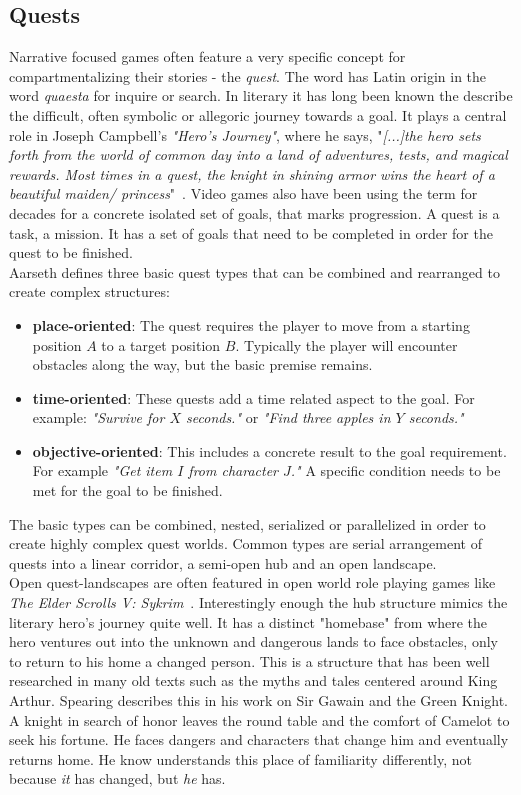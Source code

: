 \subsection{Quests}
Narrative focused games often feature a very specific concept for compartmentalizing their stories - the \textit{quest}. The word has Latin origin in the word \textit{quaesta} for inquire or search. In literary it has long been known the describe the difficult, often symbolic or allegoric journey towards a goal. It plays a central role in Joseph Campbell's \textit{"Hero's Journey"}, where he says, "\textit{[...]the hero sets forth from the world of common day into a land of adventures, tests, and magical rewards. Most times in a quest, the knight in shining armor wins the heart of a beautiful maiden/ princess}"~\cite{Campbell2008}. Video games also have been using the term for decades for a concrete isolated set of goals, that marks progression. A quest is a task, a mission. It has a set of goals that need to be completed in order for the quest to be finished.\\
Aarseth defines three basic quest types that can be combined and rearranged to create complex structures:
\begin{itemize}
	\item \textbf{place-oriented}: The quest requires the player to move from a starting position $A$ to a target position $B$. Typically the player will encounter obstacles along the way, but the basic premise remains.
	\item \textbf{time-oriented}: These quests add a time related aspect to the goal. For example: \textit{"Survive for $X$ seconds."} or \textit{"Find three apples in $Y$ seconds."}
	\item \textbf{objective-oriented}: This includes a concrete result to the goal requirement. For example \textit{"Get item $I$ from character $J$."} A specific condition needs to be met for the goal to be finished.
\end{itemize} 
The basic types can be combined, nested, serialized or parallelized in order to create highly complex quest worlds. Common types are serial arrangement of quests into a linear corridor, a semi-open hub and an open landscape.~\cite{Aarseth2005}\\
Open quest-landscapes are often featured in open world role playing games like \textit{The Elder Scrolls V: Sykrim}~\cite{skyrim}. Interestingly enough the hub structure mimics the literary hero's journey quite well. It has a distinct "homebase" from where the hero ventures out into the unknown and dangerous lands to face obstacles, only to return to his home a changed person. This is a structure that has been well researched in many old texts such as the myths and tales centered around King Arthur. Spearing describes this in his work on Sir Gawain and the Green Knight. A knight in search of honor leaves the round table and the comfort of Camelot to seek his fortune. He faces dangers and characters that change him and eventually returns home. He know understands this place of familiarity differently, not because \textit{it} has changed, but \textit{he} has.~\cite{Spearing1994}\\
